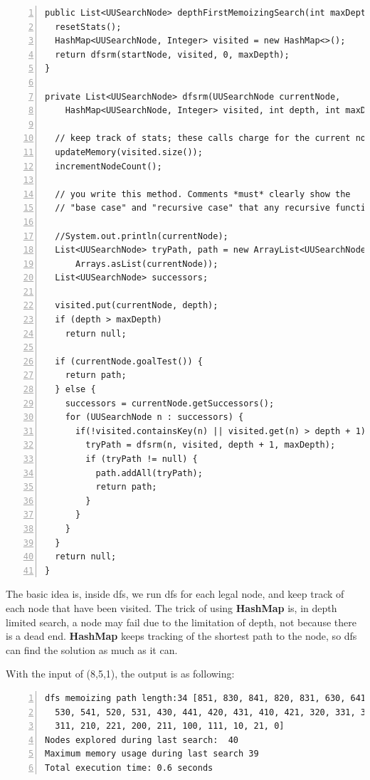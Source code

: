 \documentclass{article}
\begin{document}
\begin{lstlisting}[numbers=left]
public List<UUSearchNode> depthFirstMemoizingSearch(int maxDepth) {
  resetStats();
  HashMap<UUSearchNode, Integer> visited = new HashMap<>();
  return dfsrm(startNode, visited, 0, maxDepth);
}

private List<UUSearchNode> dfsrm(UUSearchNode currentNode,
    HashMap<UUSearchNode, Integer> visited, int depth, int maxDepth) {

  // keep track of stats; these calls charge for the current node
  updateMemory(visited.size());
  incrementNodeCount();

  // you write this method. Comments *must* clearly show the
  // "base case" and "recursive case" that any recursive function has.

  //System.out.println(currentNode);
  List<UUSearchNode> tryPath, path = new ArrayList<UUSearchNode>(
      Arrays.asList(currentNode));
  List<UUSearchNode> successors;

  visited.put(currentNode, depth);
  if (depth > maxDepth)
    return null;      
  
  if (currentNode.goalTest()) {
    return path;
  } else {
    successors = currentNode.getSuccessors();
    for (UUSearchNode n : successors) {
      if(!visited.containsKey(n) || visited.get(n) > depth + 1) {
        tryPath = dfsrm(n, visited, depth + 1, maxDepth);
        if (tryPath != null) {
          path.addAll(tryPath);
          return path;
        }
      }
    }
  }
  return null;
}
\end{lstlisting}

The basic idea is, inside dfs, we run dfs for each legal node, and keep track of each node that have been visited. The trick of using \textbf{HashMap} is, in depth limited search, a node may fail due to the limitation of depth, not because there is a dead end. \textbf{HashMap} keeps tracking of the shortest path to the node, so dfs can find the solution as much as it can.

With the input of (8,5,1), the output is as following:

\begin{lstlisting}[numbers=left]
dfs memoizing path length:34 [851, 830, 841, 820, 831, 630, 641, 540, 551,
  530, 541, 520, 531, 430, 441, 420, 431, 410, 421, 320, 331, 310, 321, 300,
  311, 210, 221, 200, 211, 100, 111, 10, 21, 0]
Nodes explored during last search:  40
Maximum memory usage during last search 39
Total execution time: 0.6 seconds
\end{lstlisting}
\end{document}
